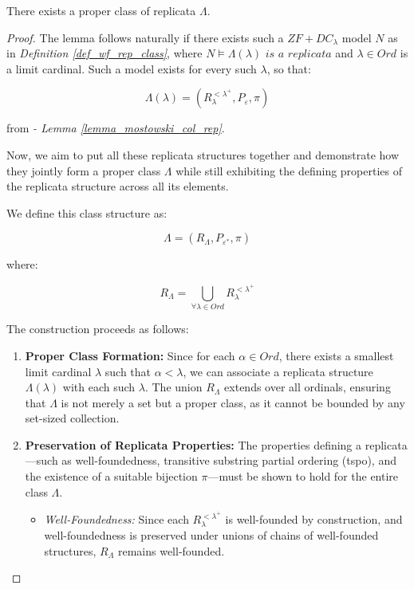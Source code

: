 \begin{lemma}\label{lemma_rep_schema}
    There exists a proper class of replicata $\Lambda$.
\end{lemma}
\begin{proof}
    The lemma follows naturally if there exists such a $ZF+DC_\lambda$ model $N$ as in \textit{Definition \ref{def_wf_rep_class}}, where
    $N \models \Lambda(\lambda) \textit{ is a replicata}$ and $\lambda \in Ord$ is a limit cardinal. Such a model exists for every such $\lambda$, so that:
    
    \[
    \Lambda(\lambda) = (R^{<\lambda^+}_\lambda, P_{\varepsilon}, \pi)
    \]
    
    from \textit{ - Lemma
    \ref{lemma_mostowski_col_rep}}.
    
    Now, we aim to put all these replicata structures together and demonstrate how they jointly form a proper class $\Lambda$ while still exhibiting the defining properties of the replicata structure across all its elements.
    
    We define this class structure as:
    
    \[
    \Lambda = (R_\Lambda, P_{\varepsilon^\ast}, \pi)
    \]
    
    where:
    
    \[
    R_\Lambda = \bigcup_{\forall \lambda \in Ord}{R^{<\lambda^+}_\lambda}
    \]
    
    The construction proceeds as follows:
    
    \begin{enumerate}
    \item \textbf{Proper Class Formation:} Since for each $\alpha \in Ord$, there exists a smallest limit cardinal $\lambda$ such
    that $\alpha < \lambda$, we can associate a replicata structure
    $\Lambda(\lambda)$ with each such $\lambda$. The union $R_\Lambda$
    extends over all ordinals, ensuring that $\Lambda$ is not merely a set but a proper class, as it cannot be bounded by any set-sized collection.
    
    \item \textbf{Preservation of Replicata Properties:} The properties defining a replicata—such as well-foundedness, transitive substring partial ordering (tspo), and the existence of a suitable bijection $\pi$—must be shown to hold for the entire class $\Lambda$.
    
    \begin{itemize}
    \item \textit{Well-Foundedness:} Since each $R^{<\lambda^+}_\lambda$ is well-founded by construction, and well-foundedness is preserved under unions of chains of well-founded structures, $R_\Lambda$ remains well-founded.
    

\end{itemize}
\end{enumerate}
\end{proof}
